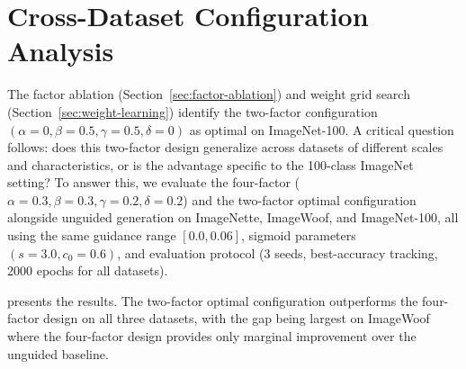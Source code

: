 \section{Cross-Dataset Configuration Analysis}
\label{sec:cross-dataset-entropy}

The factor ablation (Section~\ref{sec:factor-ablation}) and weight grid search (Section~\ref{sec:weight-learning}) identify the two-factor configuration $(\alpha{=}0, \beta{=}0.5, \gamma{=}0.5, \delta{=}0)$ as optimal on ImageNet-100. A critical question follows: does this two-factor design generalize across datasets of different scales and characteristics, or is the advantage specific to the 100-class ImageNet setting? To answer this, we evaluate the four-factor \cags{} ($\alpha{=}0.3, \beta{=}0.3, \gamma{=}0.2, \delta{=}0.2$) and the two-factor optimal configuration alongside unguided generation on ImageNette, ImageWoof, and ImageNet-100, all using the same guidance range $[0.0, 0.06]$, sigmoid parameters $(s{=}3.0, c_0{=}0.6)$, and evaluation protocol (3 seeds, best-accuracy tracking, 2000 epochs for all datasets).

 presents the results. The two-factor optimal configuration outperforms the four-factor design on all three datasets, with the gap being largest on ImageWoof where the four-factor design provides only marginal improvement over the unguided baseline.

